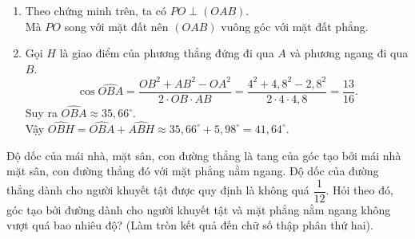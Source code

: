 \begin{bt}
\begin{vd}
{\begin{enumerate}
			\item Theo chứng minh trên, ta có $PO\perp (OAB)$.\\
			Mà $PO$ song với mặt đất nên $(OAB)$ vuông góc với mặt đất phẳng.
			
			\item Gọi $H$ là giao điểm của phương thẳng đứng đi qua $A$ và phương ngang đi qua $B$.
			\[\cos\widehat{OBA}=\dfrac{OB^2+AB^2-OA^2}{2\cdot OB\cdot AB}=\dfrac{4^2+4{,}8^2-2{,}8^2}{2\cdot 4\cdot 4{,}8}=\dfrac{13}{16}.\]
			Suy ra $\widehat{OBA}\approx 35{,}66^\circ$.\\
			Vậy $\widehat{OBH}=\widehat{OBA}+\widehat{ABH}\approx 35{,}66^\circ+5{,}98^\circ=41{,}64^\circ$.
		\end{enumerate}
	} 
\end{vd}

\begin{vd}%
	Độ dốc của mái nhà, mặt sân, con đường thẳng là tang của góc tạo bởi mái nhà mặt sân, con đường thẳng đó với mặt phẳng nằm ngang. Độ dốc của đường thẳng dành cho người khuyết tật được quy định là không quá $\dfrac{1}{12}$. Hỏi theo đó, góc tạo bởi đường dành cho người khuyết tật và mặt phẳng nằm ngang không vượt quá bao nhiêu độ? (Làm tròn kết quả đến chữ số thập phân thứ hai).
\end{vd}


\end{bt}
